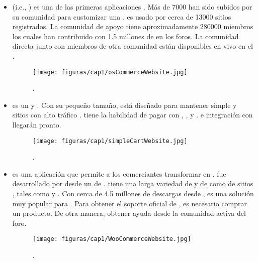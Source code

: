 \begin{itemize}
	\item \textbf{\nameOsCommerce} (i.e., \openSourcePC \commerceCOM) es una de las primeras aplicaciones \ecommerceCOM \openSourcePC. Más de 7000 \freePC \addOns han sido subidos por su comunidad para customizar una \store \online. \nameOsCommerce es usado por cerca de 13000 sitios registrados. La comunidad de apoyo tiene aproximadamente 280000 miembros los cuales han contribuido con 1.5 millones de \posts en los foros. La comunidad directa junto con miembros de otra comunidad están disponibles en vivo en el \chat \room.

	\begin{figure}[H]
		\centering
		\texttt{[image: figuras/cap1/osCommerceWebsite.jpg]}
		\caption{\nameOsCommerce \websiteINT \cite{online_osCommerce}.}
	\end{figure}

	\item \textbf{\nameSimpleCart} es un \freePC y \openSourcePC \javaScriptNAME \shoppingCart. Con su pequeño tamaño, \nameSimpleCart está diseñado para mantener simple  y sitios con alto tráfico \runningCPT \fast. \nameSimpleCart tiene la habilidad de pagar con \paypalCheckout, \googleCheckout, y \amazonPayments. \email \checkoutCOM e integración con \AuthorizeNet llegarán pronto.
	
	\begin{figure}[H]
		\centering
		\texttt{[image: figuras/cap1/simpleCartWebsite.jpg]}
		\caption{\nameSimpleCart \websiteINT \cite{online_simpleCart}.}
	\end{figure}

	\item \textbf{\nameWooCommerce} es una aplicación \ecommerceCOM \freePC \openSourcePC que permite a los comerciantes transformar \wordPressNAME \sitesINT en \stores. \nameWooCommerce fue desarrollado por \wooThemes desde un \fork de \nameJigoshop. \nameWooCommerce tiene una larga variedad de  \pluginsAS y  \themesCPT de \wooThemes como de sitios \thirdParty, tales como \themeForest \cite{online_ThemeForest} y \codeCanyon \cite{online_CodeCanyon}. Con cerca de 4.5 millones de descargas desde \wordPressOrg\cite{online_WordPress}, \nameWooCommerce es una solución \ecommerceCOM muy popular para \wordPressNAME. Para obtener el soporte oficial de \wooThemes, es necesario comprar un producto. De otra manera, obtener ayuda desde la comunidad activa del foro.

	\begin{figure}[H]
		\centering
		\texttt{[image: figuras/cap1/WooCommerceWebsite.jpg]}
		\caption{\nameWooCommerce \websiteINT \cite{online_WooCommerce}.}
	\end{figure}


\end{itemize}
